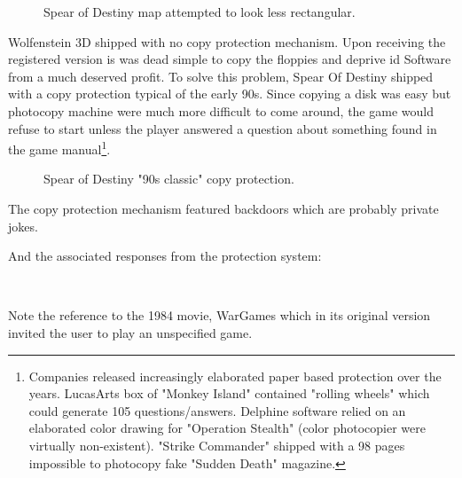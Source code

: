\documentclass[book.tex]{subfiles}
\begin{document}
   \par
\begin{figure}[H]
\centering
 
 \caption{Spear of Destiny map attempted to look less rectangular.}
 \end{figure}
 \par

Wolfenstein 3D shipped with no copy protection mechanism. Upon receiving the registered version is was dead simple to copy the floppies and deprive id Software from a much deserved profit. To solve this problem, Spear Of Destiny shipped with a copy protection typical of the early 90s. Since copying a disk was easy but photocopy machine were much more difficult to come around, the game would refuse to start unless the player answered a question about something found in the game manual\footnote{Companies released increasingly elaborated paper based protection over the years. LucasArts box of "Monkey Island" contained "rolling wheels" which could generate 105 questions/answers. Delphine software relied on an elaborated color drawing for "Operation Stealth" (color photocopier were virtually non-existent). "Strike Commander" shipped with a 98 pages impossible to photocopy fake "Sudden Death" magazine.}.
    
\begin{figure}[H]
\centering
 \caption{Spear of Destiny "90s classic" copy protection.}
 \end{figure}
 \par
 The copy protection mechanism featured backdoors which are probably private jokes.\\
\par
\begin{minipage}{\textwidth}

\end{minipage}
\par
And the associated responses from the protection system:


\begin{minipage}{\textwidth}

\end{minipage}\\
\par
Note the reference to the 1984 movie, WarGames which in its original version invited the user to play an unspecified game.
    \par
\begin{figure}[H]
\centering
 \end{figure}
 \par
\end{document}
